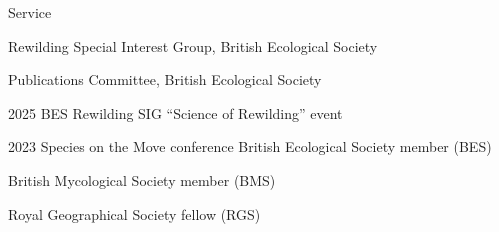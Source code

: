 \begin{rubric}{Service}
	\par Rewilding Special Interest Group, British Ecological Society
	\par Publications Committee, British Ecological Society	
	\par 2025 BES Rewilding SIG ``Science of Rewilding'' event
	\par 2023 Species on the Move conference 
	British Ecological Society member (BES)
	\par British Mycological Society member (BMS)
	\par Royal Geographical Society fellow (RGS)
\end{rubric}

